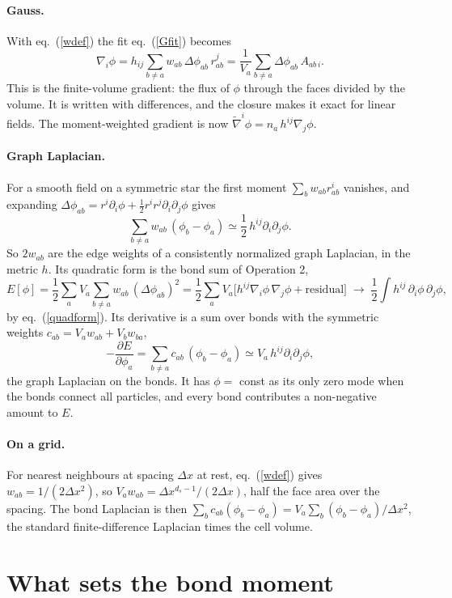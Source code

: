 \documentclass[11pt,aps,preprint,nofootinbib,superscriptaddress,tightenlines]{revtex4-2}
\def\st{\begin{equation}}
\def\stp{\end{equation}}
\def\Eq#1{eq.~(\ref{#1})}
\let\oldparagraph\paragraph
\renewcommand{\paragraph}{\par\medskip\oldparagraph}
\begin{document}
\paragraph{Gauss.}  With \Eq{wdef} the fit \Eq{Gfit} becomes
\st
\nabla_i\phi=h_{ij}\sum_{b\neq a}w_{ab}\,\Delta\phi_{ab}\,r^j_{ab}
=\frac{1}{V_a}\sum_{b\neq a}\Delta\phi_{ab}\,A_{ab\,i} .
\label{Ggauss}
\stp
This is the finite-volume gradient: the flux of $\phi$ through the faces divided
by the volume.  It is written with differences, and the closure makes it exact for
linear fields.  The moment-weighted gradient is now $\tilde\nabla^i\phi=n_a\,h^{ij}\nabla_j\phi$.

\paragraph{Graph Laplacian.}  For a smooth field on a symmetric star the first
moment $\sum_bw_{ab}r^i_{ab}$ vanishes, and expanding
$\Delta\phi_{ab}=r^i\partial_i\phi+\frac12r^ir^j\partial_i\partial_j\phi$ gives
\st
\sum_{b\neq a}w_{ab}\,(\phi_b-\phi_a)\simeq\frac12\,h^{ij}\partial_i\partial_j\phi .
\label{graphlap}
\stp
So $2w_{ab}$ are the edge weights of a consistently normalized graph Laplacian,
in the metric $h$.  Its quadratic form is the bond sum of Operation 2,
\st
E[\phi]=\frac12\sum_aV_a\sum_{b\neq a}w_{ab}\,(\Delta\phi_{ab})^2
=\frac12\sum_aV_a\big[h^{ij}\nabla_i\phi\,\nabla_j\phi+\text{residual}\big]
\;\longrightarrow\;\frac12\int h^{ij}\,\partial_i\phi\,\partial_j\phi ,
\stp
by \Eq{quadform}.  Its derivative is a sum over bonds with the symmetric
weights $c_{ab}=V_aw_{ab}+V_bw_{ba}$,
\st
-\frac{\partial E}{\partial\phi_a}=\sum_{b\neq a}c_{ab}\,(\phi_b-\phi_a)
\simeq V_a\,h^{ij}\partial_i\partial_j\phi ,
\stp
the graph Laplacian on the bonds.  It has $\phi=$ const as its only zero mode
when the bonds connect all particles, and every bond contributes a non-negative
amount to $E$.

\paragraph{On a grid.}  For nearest neighbours at spacing $\Delta x$ at rest,
\Eq{wdef} gives $w_{ab}=1/(2\Delta x^2)$, so $V_aw_{ab}=\Delta x^{d_s-1}/(2\Delta x)$,
half the face area over the spacing.  The bond Laplacian is then
$\sum_bc_{ab}(\phi_b-\phi_a)=V_a\sum_b(\phi_b-\phi_a)/\Delta x^2$, the standard
finite-difference Laplacian times the cell volume.

\section{What sets the bond moment}
\label{sec:sets}
\end{document}
